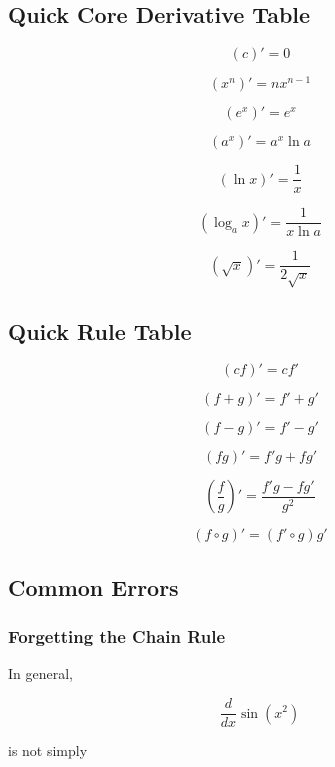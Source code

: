 \subsection{Quick Core Derivative Table}
\label{subsec:quick-core-derivative-table}

\[
\boxed{
(c)'=0
}
\]

\[
\boxed{
(x^n)'=nx^{n-1}
}
\]

\[
\boxed{
(e^x)'=e^x
}
\]

\[
\boxed{
(a^x)'=a^x\ln a
}
\]

\[
\boxed{
(\ln x)'=\frac1x
}
\]

\[
\boxed{
(\log_a x)'
=
\frac{1}{x\ln a}
}
\]

\[
\boxed{
(\sqrt{x})'
=
\frac{1}{2\sqrt{x}}
}
\]

\subsection{Quick Rule Table}
\label{subsec:quick-derivative-rule-table}

\[
\boxed{
(cf)'=cf'
}
\]

\[
\boxed{
(f+g)'=f'+g'
}
\]

\[
\boxed{
(f-g)'=f'-g'
}
\]

\[
\boxed{
(fg)'=f'g+fg'
}
\]

\[
\boxed{
\left(
\frac fg
\right)'
=
\frac{
f'g-fg'
}{
g^2
}
}
\]

\[
\boxed{
(f\circ g)'
=
(f'\circ g)g'
}
\]

\subsection{Common Errors}
\label{subsec:derivative-tables-common-errors}

\subsubsection{Forgetting the Chain Rule}

In general,

\[
\frac{d}{dx}
\sin(x^2)
\]

is not simply

